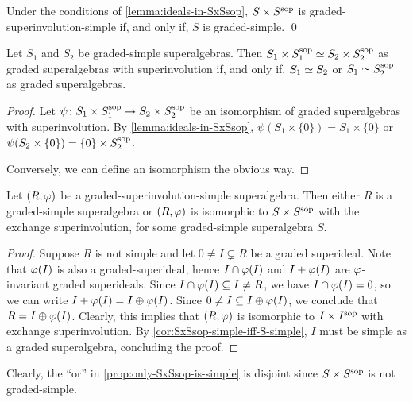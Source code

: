 \begin{cor}\label{cor:SxSsop-simple-iff-S-simple}
    Under the conditions of \cref{lemma:ideals-in-SxSsop}, $S\times S^{\mathrm{sop}}$ is graded-superinvolution-simple if, and only if, $S$ is graded-simple. \qed
\end{cor}

\begin{cor}\label{cor:iso-SxSsop}
    Let $S_1$ and $S_2$ be graded-simple superalgebras. 
    Then $S_1\times S_1^{\mathrm{sop}} \simeq S_2\times S_2^{\mathrm{sop}}$ as graded superalgebras with superinvolution if, and only if, $S_1 \simeq S_2$ or $S_1 \simeq S_2^{\mathrm{sop}}$ as graded superalgebras.
\end{cor}

\begin{proof}
    Let $\psi\colon S_1\times S_1^{\mathrm{sop}} \to S_2\times S_2^{\mathrm{sop}}$ be an isomorphism of graded superalgebras with superinvolution. 
    By \cref{lemma:ideals-in-SxSsop}, $\psi(S_1\times \{ 0 \}) = S_1\times \{ 0 \}$ or $\psi(S_2\times \{ 0 \}) = \{ 0 \} \times S_2^{\mathrm{sop}}$. 
    
    Conversely, we can define an isomorphism the obvious way.
\end{proof}

\begin{prop}\label{prop:only-SxSsop-is-simple}
	Let $(R, \varphi)$ be a graded-superinvolution-simple superalgebra. 
	Then either $R$ is a graded-simple superalgebra or $(R, \varphi)$ is isomorphic to $S\times S^{\mathrm{sop}}$ with the exchange superinvolution, for some graded-simple superalgebra $S$.
\end{prop}

\begin{proof}
	Suppose $R$ is not simple and let $0 \neq I \subsetneq R$ be a graded superideal.
	Note that $\varphi(I)$ is also a graded-superideal, hence $I \cap \varphi(I)$ and $I + \varphi (I)$ are $\varphi$-invariant graded superideals. 
	Since $I \cap \varphi(I) \subseteq I \neq R$, we have $I \cap \varphi(I) = 0$, so we can write $I + \varphi (I) = I \oplus \varphi (I)$. 
	Since $0 \neq I \subseteq I \oplus \varphi (I)$, we conclude that $R = I \oplus \varphi (I)$.
	Clearly, this implies that $(R, \varphi)$ is isomorphic to $I \times I^{\mathrm{sop}}$ with exchange superinvolution. 
	By \cref{cor:SxSsop-simple-iff-S-simple}, $I$ must be simple as a graded superalgebra, concluding the proof. 
\end{proof}

Clearly, the ``or'' in \cref{prop:only-SxSsop-is-simple} is disjoint since $S\times S^{\mathrm{sop}}$ is not graded-simple.

